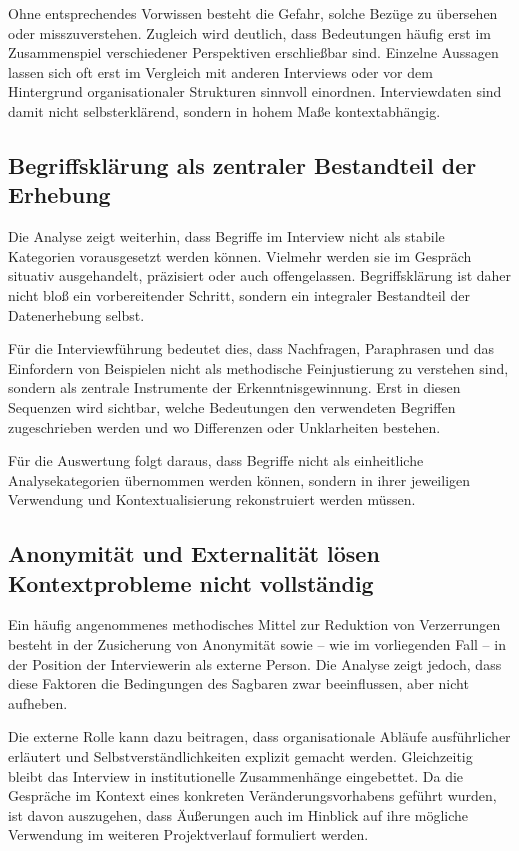 \documentclass[a4paper,
fontsize=11pt,
oneside,
numbers=noperiodatend,
parskip=half-,
bibliography=totoc,
final
]{scrartcl}
\begin{document}
Ohne entsprechendes Vorwissen besteht die Gefahr, solche Bezüge zu
übersehen oder misszuverstehen. Zugleich wird deutlich, dass Bedeutungen
häufig erst im Zusammenspiel verschiedener Perspektiven erschließbar
sind. Einzelne Aussagen lassen sich oft erst im Vergleich mit anderen
Interviews oder vor dem Hintergrund organisationaler Strukturen sinnvoll
einordnen. Interviewdaten sind damit nicht selbsterklärend, sondern in
hohem Maße kontextabhängig.

\subsection{Begriffsklärung als zentraler Bestandteil der
Erhebung}\label{begriffskluxe4rung-als-zentraler-bestandteil-der-erhebung}

Die Analyse zeigt weiterhin, dass Begriffe im Interview nicht als
stabile Kategorien vorausgesetzt werden können. Vielmehr werden sie im
Gespräch situativ ausgehandelt, präzisiert oder auch offengelassen.
Begriffsklärung ist daher nicht bloß ein vorbereitender Schritt, sondern
ein integraler Bestandteil der Datenerhebung selbst.

Für die Interviewführung bedeutet dies, dass Nachfragen, Paraphrasen und
das Einfordern von Beispielen nicht als methodische Feinjustierung zu
verstehen sind, sondern als zentrale Instrumente der
Erkenntnisgewinnung. Erst in diesen Sequenzen wird sichtbar, welche
Bedeutungen den verwendeten Begriffen zugeschrieben werden und wo
Differenzen oder Unklarheiten bestehen.

Für die Auswertung folgt daraus, dass Begriffe nicht als einheitliche
Analysekategorien übernommen werden können, sondern in ihrer jeweiligen
Verwendung und Kontextualisierung rekonstruiert werden müssen.

\subsection{Anonymität und Externalität lösen Kontextprobleme nicht
vollständig}\label{anonymituxe4t-und-externalituxe4t-luxf6sen-kontextprobleme-nicht-vollstuxe4ndig}

Ein häufig angenommenes methodisches Mittel zur Reduktion von
Verzerrungen besteht in der Zusicherung von Anonymität sowie -- wie im
vorliegenden Fall -- in der Position der Interviewerin als externe
Person. Die Analyse zeigt jedoch, dass diese Faktoren die Bedingungen
des Sagbaren zwar beeinflussen, aber nicht aufheben.

Die externe Rolle kann dazu beitragen, dass organisationale Abläufe
ausführlicher erläutert und Selbstverständlichkeiten explizit gemacht
werden. Gleichzeitig bleibt das Interview in institutionelle
Zusammenhänge eingebettet. Da die Gespräche im Kontext eines konkreten
Veränderungsvorhabens geführt wurden, ist davon auszugehen, dass
Äußerungen auch im Hinblick auf ihre mögliche Verwendung im weiteren
Projektverlauf formuliert werden.
\end{document}
